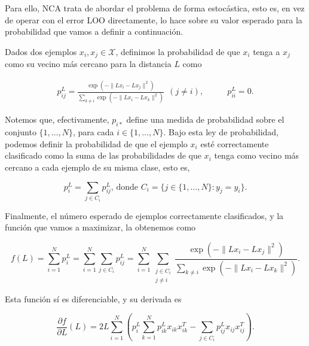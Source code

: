 \documentclass{book}
\begin{document}
Para ello, NCA trata de abordar el problema de forma estocástica, esto es, en vez de operar con el error LOO directamente, lo hace sobre su valor esperado para la probabilidad que vamos a definir a continuación.

Dados dos ejemplos $x_i, x_j \in \mathcal{X}$, definimos la probabilidad de que $x_i$ tenga a $x_j$ como su vecino más cercano para la distancia $L$ como

\begin{equation}
	\begin{split}
	p_{ij}^L = \frac{\exp\left( - \|Lx_i - Lx_j \|^2 \right)}{\sum\limits_{k \ne i} \exp\left(-\|Lx_i - Lx_k \|^2\right)}\ \ (j \ne i),  
	\end{split}
	\quad\quad
	\begin{split}
	p_{ii}^L = 0.
	\end{split}
\end{equation}

Notemos que, efectivamente, $p_{i*}$ define una medida de probabilidad sobre el conjunto $\{1,\dots,N\}$, para cada $i \in \{1,\dots,N\}$. Bajo esta ley de probabilidad, podemos definir la probabilidad de que el ejemplo $x_i$ esté correctamente clasificado como la suma de las probabilidades de que $x_i$ tenga como vecino más cercano a cada ejemplo de su misma clase, esto es,

\begin{equation}
	p_i^L = \sum_{j \in C_i} p_{ij}^L \text{, donde } C_i = \{j \in \{1,\dots,N\}\colon y_j = y_i\}.
\end{equation}

Finalmente, el número esperado de ejemplos correctamente clasificados, y la función que vamos a maximizar, la obtenemos como

\begin{equation}
	f(L) = \sum_{i=1}^N p_i^L = \sum_{i=1}^N \sum_{j \in C_i} p_{ij}^L = \sum_{i=1}^N \sum_{\substack{j \in C_i \\ j \ne i}} \frac{\exp\left(-\|Lx_i - Lx_j \|^2\right)}{\sum\limits_{k \ne i} \exp\left( -\|Lx_i - Lx_k\|^2 \right)}.
\end{equation}

Esta función sí es diferenciable, y su derivada es

\begin{equation}
	\frac{\partial f}{\partial L}(L) = 2L \sum_{i=1}^N \left( p_i^L \sum_{k=1}^N p_{ik}^L x_{ik}x_{ik}^T - \sum_{j \in C_i} p_{ij}^Lx_{ij}x_{ij}^T \right).
\end{equation}
\end{document}
